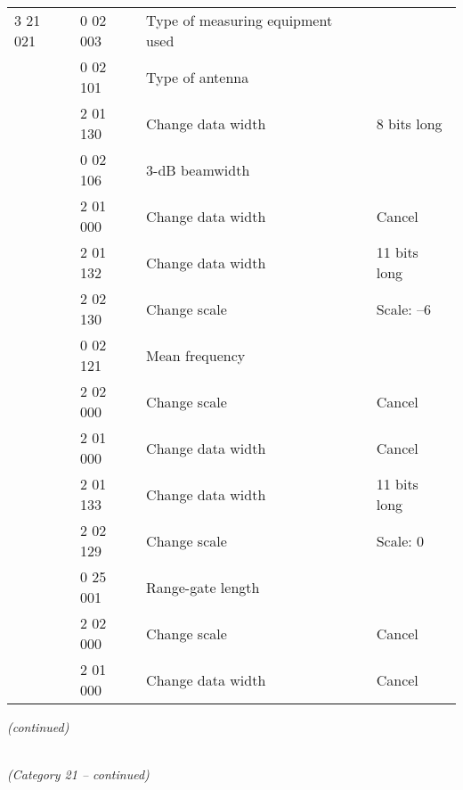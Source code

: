 \begin{longtable}[]{@{}llll@{}}
3 21 021 & 0 02 003 & Type of measuring equipment used &\tabularnewline
& 0 02 101 & Type of antenna &\tabularnewline
& 2 01 130 & Change data width & 8 bits long\tabularnewline
& 0 02 106 & 3-dB beamwidth &\tabularnewline
& 2 01 000 & Change data width & Cancel\tabularnewline
& 2 01 132 & Change data width & 11 bits long\tabularnewline
& 2 02 130 & Change scale & Scale: --6\tabularnewline
& 0 02 121 & Mean frequency &\tabularnewline
& 2 02 000 & Change scale & Cancel\tabularnewline
& 2 01 000 & Change data width & Cancel\tabularnewline
& 2 01 133 & Change data width & 11 bits long\tabularnewline
& 2 02 129 & Change scale & Scale: 0\tabularnewline
& 0 25 001 & Range-gate length &\tabularnewline
& 2 02 000 & Change scale & Cancel\tabularnewline
& 2 01 000 & Change data width & Cancel\tabularnewline
\bottomrule
\end{longtable}

\emph{(continued)}

\emph{\\
(Category 21 -- continued)}

